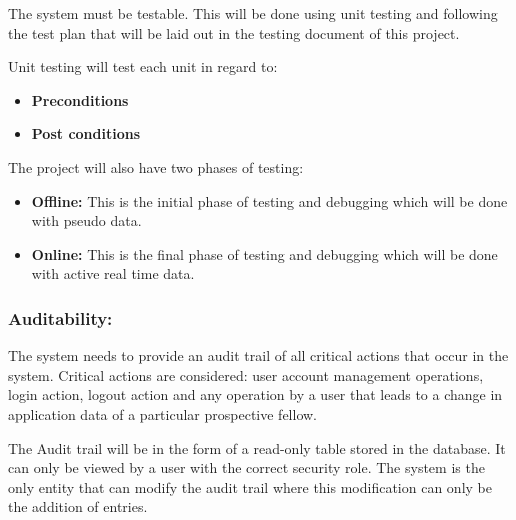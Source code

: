 \documentclass[12pt]{article}
\begin{document}
		\begin{flushleft}
		
		The system must be testable. This will be done using unit testing and following the test plan that will be laid out in the testing document of this project.\\
		
		\vspace{0.1in}
		
		Unit testing will test each unit in regard to:
		\begin{itemize}
		
		\item\textbf{Preconditions}
		\item\textbf{Post conditions}
		
		\end{itemize}
		
		The project will also have two phases of testing:
		
		\begin{itemize}
		
		\item\textbf{Offline:} This is the initial phase of testing and debugging which will be done with pseudo data.
		\item\textbf{Online:} This is the final phase of testing and debugging which will be done with active real time data.
		
		\end{itemize}
		
		\end{flushleft}
		
		\vspace{0.1in}
		
		\subsubsection{Auditability:}
				
		\begin{flushleft}
		
		The system needs to provide an audit trail of all critical actions that occur in the system. Critical actions are considered: user account management operations, login action, logout action and any operation by a user that leads to a change in application data of a particular prospective fellow.\\
		
		\vspace{0.1in}
		
		The Audit trail will be in the form of a read-only table stored in the database. It can only be viewed by a user with the correct security role. The system is the only entity that can modify the audit trail where this modification can only be the addition of entries.
		
		\end{flushleft}
		\vspace{0.1in}	
		
\end{document}
